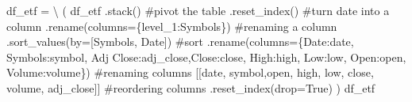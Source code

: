 \documentclass[
  letterpaper,
  DIV=11,
  numbers=noendperiod]{scrreprt}
\newenvironment{Shaded}{\begin{snugshade}}{\end{snugshade}}
\newcommand{\CommentTok}[1]{\textcolor[rgb]{0.37,0.37,0.37}{#1}}
\newcommand{\NormalTok}[1]{\textcolor[rgb]{0.00,0.23,0.31}{#1}}
\newcommand{\OperatorTok}[1]{\textcolor[rgb]{0.37,0.37,0.37}{#1}}
\newcommand{\StringTok}[1]{\textcolor[rgb]{0.13,0.47,0.30}{#1}}
\newcommand{\VariableTok}[1]{\textcolor[rgb]{0.07,0.07,0.07}{#1}}
\begin{document}
\begin{Shaded}
\begin{Highlighting}[]
\NormalTok{df\_etf }\OperatorTok{=} \OperatorTok{\textbackslash{}}
\NormalTok{    (}
\NormalTok{    df\_etf}
\NormalTok{        .stack() }\CommentTok{\#pivot the table}
\NormalTok{        .reset\_index() }\CommentTok{\#turn date into a column}
\NormalTok{        .rename(columns}\OperatorTok{=}\NormalTok{\{}\StringTok{\textquotesingle{}level\_1\textquotesingle{}}\NormalTok{:}\StringTok{\textquotesingle{}Symbols\textquotesingle{}}\NormalTok{\}) }\CommentTok{\#renaming a column}
\NormalTok{        .sort\_values(by}\OperatorTok{=}\NormalTok{[}\StringTok{\textquotesingle{}Symbols\textquotesingle{}}\NormalTok{, }\StringTok{\textquotesingle{}Date\textquotesingle{}}\NormalTok{]) }\CommentTok{\#sort}
\NormalTok{        .rename(columns}\OperatorTok{=}\NormalTok{\{}\StringTok{\textquotesingle{}Date\textquotesingle{}}\NormalTok{:}\StringTok{\textquotesingle{}date\textquotesingle{}}\NormalTok{, }\StringTok{\textquotesingle{}Symbols\textquotesingle{}}\NormalTok{:}\StringTok{\textquotesingle{}symbol\textquotesingle{}}\NormalTok{, }\StringTok{\textquotesingle{}Adj Close\textquotesingle{}}\NormalTok{:}\StringTok{\textquotesingle{}adj\_close\textquotesingle{}}\NormalTok{,}\StringTok{\textquotesingle{}Close\textquotesingle{}}\NormalTok{:}\StringTok{\textquotesingle{}close\textquotesingle{}}\NormalTok{, }
                         \StringTok{\textquotesingle{}High\textquotesingle{}}\NormalTok{:}\StringTok{\textquotesingle{}high\textquotesingle{}}\NormalTok{, }\StringTok{\textquotesingle{}Low\textquotesingle{}}\NormalTok{:}\StringTok{\textquotesingle{}low\textquotesingle{}}\NormalTok{, }\StringTok{\textquotesingle{}Open\textquotesingle{}}\NormalTok{:}\StringTok{\textquotesingle{}open\textquotesingle{}}\NormalTok{, }\StringTok{\textquotesingle{}Volume\textquotesingle{}}\NormalTok{:}\StringTok{\textquotesingle{}volume\textquotesingle{}}\NormalTok{\}) }\CommentTok{\#renaming columns}
\NormalTok{        [[}\StringTok{\textquotesingle{}date\textquotesingle{}}\NormalTok{, }\StringTok{\textquotesingle{}symbol\textquotesingle{}}\NormalTok{,}\StringTok{\textquotesingle{}open\textquotesingle{}}\NormalTok{, }\StringTok{\textquotesingle{}high\textquotesingle{}}\NormalTok{, }\StringTok{\textquotesingle{}low\textquotesingle{}}\NormalTok{, }\StringTok{\textquotesingle{}close\textquotesingle{}}\NormalTok{, }\StringTok{\textquotesingle{}volume\textquotesingle{}}\NormalTok{, }\StringTok{\textquotesingle{}adj\_close\textquotesingle{}}\NormalTok{]] }\CommentTok{\#reordering columns}
\NormalTok{        .reset\_index(drop}\OperatorTok{=}\VariableTok{True}\NormalTok{)    }
\NormalTok{    )}
\NormalTok{df\_etf}
\end{Highlighting}
\end{Shaded}
\end{document}
